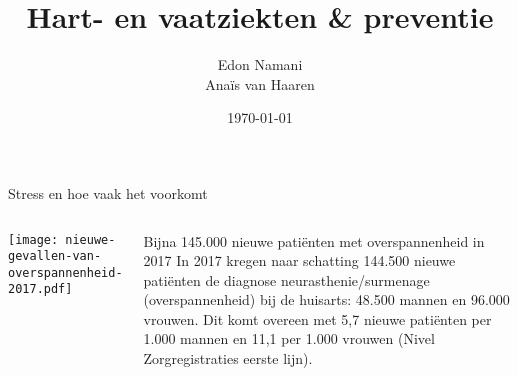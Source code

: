 \documentclass{beamer}
\title[TedTalk]{Hart- en vaatziekten \& preventie}
\date{\today}
\author[Edon Namani, et. al]
{%
	Edon Namani\\
    Anaïs van Haaren
}
\institute[%
	Faculteit Gezondheidswetenschappen\\
	Rijksuniversiteit Groningen\\
	Nederland
]
{%
	Faculteit Gezondheidswetenschappen\\
	Rijksuniversiteit Groningen\\
	Nederland

}
\begin{document}
{\aauwavesbg%
	\begin{frame}
	\titlepage
\end{frame}}

\begin{frame}{Stress en hoe vaak het voorkomt}
    \begin{columns}
        \texttt{[image: nieuwe-gevallen-van-overspannenheid-2017.pdf]}
    \begin{block}{Bijna 145.000 nieuwe patiënten met overspannenheid in 2017}
        In 2017 kregen naar schatting 144.500 nieuwe patiënten de diagnose neurasthenie/surmenage (overspannenheid) bij de huisarts: 48.500 mannen en 96.000 vrouwen. Dit komt overeen met 5,7 nieuwe patiënten per 1.000 mannen en 11,1 per 1.000 vrouwen (Nivel Zorgregistraties eerste lijn).
    \end{block}
\end{columns}
\end{frame}
\end{document}
